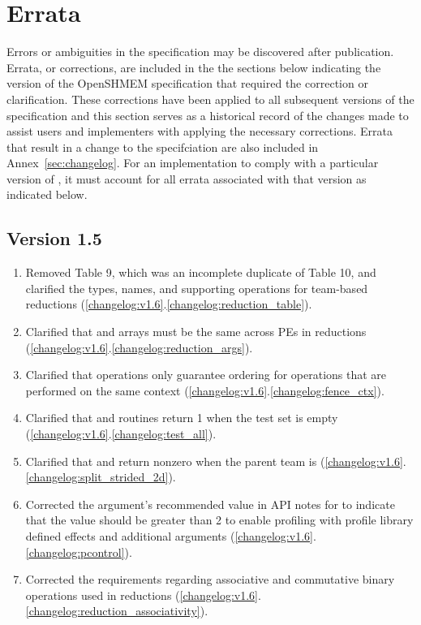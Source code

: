 \chapter{Errata}\label{sec:errata}

Errors or ambiguities in the \openshmem specification may be discovered after
publication.
Errata, or corrections, are included in the the sections below indicating the
version of the OpenSHMEM specification that required the correction or
clarification.
These corrections have been applied to all subsequent versions of the
specification and this section serves as a historical record of the changes
made to assist users and implementers with applying the necessary corrections.
Errata that result in a change to the specifciation are also included in
Annex~\ref{sec:changelog}.
For an implementation to comply with a particular version of \openshmem, it
must account for all errata associated with that version as indicated below.

\section{Version 1.5}

\begin{enumerate}
  \item Removed \openshmem[1.5] Table 9, which was an incomplete duplicate of
      \openshmem[1.5] Table 10, and clarified the types, names, and supporting
      operations for team-based reductions
        (\ref{changelog:v1.6}.\ref{changelog:reduction_table}).
  \item Clarified that  and  arrays must be the same
      across \acp{PE} in \openshmem reductions
        (\ref{changelog:v1.6}.\ref{changelog:reduction_args}).
  \item Clarified that  operations only guarantee ordering for operations
     that are performed on the same context
        (\ref{changelog:v1.6}.\ref{changelog:fence_ctx}).
  \item Clarified that  and
      routines return 1 when the test set is empty
        (\ref{changelog:v1.6}.\ref{changelog:test_all}).
  \item Clarified that  and
      return nonzero when the parent team is
        (\ref{changelog:v1.6}.\ref{changelog:split_strided_2d}).
  \item Corrected the  argument's recommended value in API notes for
      to indicate that the value should be greater than 2 to enable
     profiling with profile library defined effects and additional arguments
        (\ref{changelog:v1.6}.\ref{changelog:pcontrol}).
  \item Corrected the requirements regarding associative and commutative binary
      operations used in \openshmem reductions
        (\ref{changelog:v1.6}.\ref{changelog:reduction_associativity}).
\end{enumerate}

